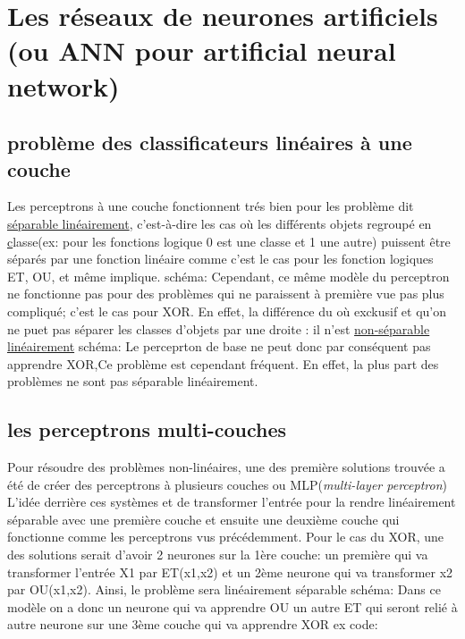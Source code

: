 \documentclass[openany,14pt,fleqn]{book} %
\begin{document}
\chapter{Les réseaux de neurones artificiels (ou ANN pour artificial neural network)}
\section{problème des classificateurs linéaires à une couche}
Les perceptrons à une couche fonctionnent trés bien pour les problème dit \underline{séparable linéairement}, c'est-à-dire les cas où les différents objets regroupé en \underline classe(ex: pour les fonctions logique 0 est une classe et 1 une autre) puissent être séparés par une fonction linéaire comme c'est le cas pour les fonction logiques ET, OU, et même implique.\cite{Hugo_Larochelle11} 
\newline schéma:
\newline Cependant, ce même modèle du perceptron ne fonctionne pas pour des problèmes qui ne paraissent à première vue pas plus compliqué; c'est le cas pour XOR.
\newline En effet, la différence du où exckusif et qu'on ne puet pas séparer les classes d'objets par une droite : il n'est \underline{non-séparable linéairement} 
\newline schéma:
\newline Le perceprton de base ne peut donc par conséquent pas apprendre XOR,Ce problème est cependant fréquent. En effet, la plus part des problèmes ne sont pas séparable linéairement.
\newline
\section{les perceptrons multi-couches}
Pour résoudre des problèmes non-linéaires, une des première solutions trouvée a été de créer des perceptrons à plusieurs couches ou MLP(\textit{multi-layer perceptron})
\newline L'idée derrière ces systèmes et de transformer l'entrée pour la rendre linéairement séparable avec une première couche et ensuite une deuxième couche qui fonctionne comme les perceptrons vus précédemment.
\newline Pour le cas du XOR, une des solutions serait d'avoir 2 neurones sur la 1ère couche: un première qui va transformer l'entrée X1 par ET(x1,x2) et un 2ème neurone qui va transformer x2 par OU(x1,x2). Ainsi, le problème sera linéairement séparable
\newline
schéma:
\newline Dans ce modèle on a donc un neurone qui va apprendre OU un autre ET qui seront relié à autre neurone sur une 3ème couche qui va apprendre XOR ex code:
\end{document}
